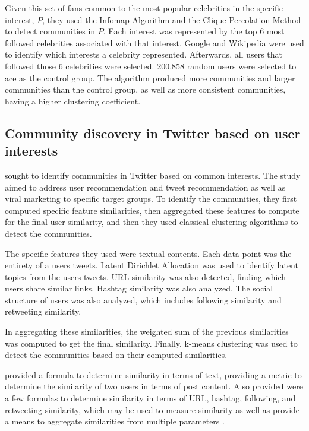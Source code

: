 Given this set of fans common to the most popular celebrities in the specific interest, $P$, they used the Infomap Algorithm and the Clique Percolation Method to detect communities in $P$. Each interest was represented by the top 6 most followed celebrities associated with that interest. Google and Wikipedia were used to identify which interests a celebrity represented. Afterwards, all users that followed those 6 celebrities were selected. 200,858 random users were selected to ace as the control group. The algorithm produced more communities and larger communities than the control group, as well as more consistent communities, having a higher clustering coefficient.


\subsection{Community discovery in Twitter based on user interests}


 sought to identify communities in Twitter based on common interests. The study aimed to address user recommendation and tweet recommendation as well as viral marketing to specific target groups. To identify the communities, they first computed specific feature similarities, then aggregated these features to compute for the final user similarity, and then they used classical clustering algorithms to detect the communities.


The specific features they used were textual contents. Each data point was the entirety of a user\vtick s tweets. Latent Dirichlet Allocation was used to identify latent topics from the user\vtick s tweets. URL similarity was also detected, finding which users share similar links. Hashtag similarity was also analyzed. The social structure of users was also analyzed, which includes following similarity and retweeting similarity. 


In aggregating these similarities, the weighted sum of the previous similarities was computed to get the final similarity. Finally, k-means clustering was used to detect the communities based on their computed similarities. 


 provided a formula to determine similarity in terms of text, providing a metric to determine the similarity of two users in terms of post content. Also provided were a few formulas to determine similarity in terms of URL, hashtag, following, and retweeting similarity, which may be used to measure similarity as well as provide a means to aggregate similarities from multiple parameters \cite{Zhang:2012}. 


